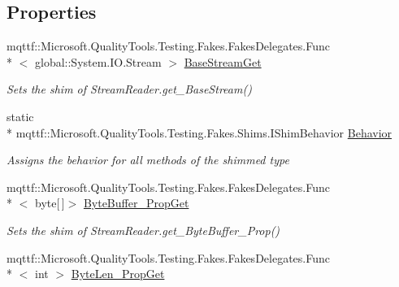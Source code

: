 \subsection*{Properties}
\begin{DoxyCompactItemize}
\item 
mqttf\-::\-Microsoft.\-Quality\-Tools.\-Testing.\-Fakes.\-Fakes\-Delegates.\-Func\\*
$<$ global\-::\-System.\-I\-O.\-Stream $>$ \hyperlink{class_system_1_1_i_o_1_1_fakes_1_1_shim_stream_reader_a6635465c3244847635a53f342d179942}{Base\-Stream\-Get}
\begin{DoxyCompactList}\small\item\em Sets the shim of Stream\-Reader.\-get\-\_\-\-Base\-Stream()\end{DoxyCompactList}\item 
static \\*
mqttf\-::\-Microsoft.\-Quality\-Tools.\-Testing.\-Fakes.\-Shims.\-I\-Shim\-Behavior \hyperlink{class_system_1_1_i_o_1_1_fakes_1_1_shim_stream_reader_a65bcbc529e89d83ff2704848cfb3d369}{Behavior}
\begin{DoxyCompactList}\small\item\em Assigns the behavior for all methods of the shimmed type\end{DoxyCompactList}\item 
mqttf\-::\-Microsoft.\-Quality\-Tools.\-Testing.\-Fakes.\-Fakes\-Delegates.\-Func\\*
$<$ byte\mbox{[}$\,$\mbox{]}$>$ \hyperlink{class_system_1_1_i_o_1_1_fakes_1_1_shim_stream_reader_a6725ea89a590a081ef31ce6e598b1b84}{Byte\-Buffer\-\_\-\-Prop\-Get}
\begin{DoxyCompactList}\small\item\em Sets the shim of Stream\-Reader.\-get\-\_\-\-Byte\-Buffer\-\_\-\-Prop()\end{DoxyCompactList}\item 
mqttf\-::\-Microsoft.\-Quality\-Tools.\-Testing.\-Fakes.\-Fakes\-Delegates.\-Func\\*
$<$ int $>$ \hyperlink{class_system_1_1_i_o_1_1_fakes_1_1_shim_stream_reader_a02b16d880a394a71193d8a0bb71401b6}{Byte\-Len\-\_\-\-Prop\-Get}

\end{DoxyCompactItemize}
